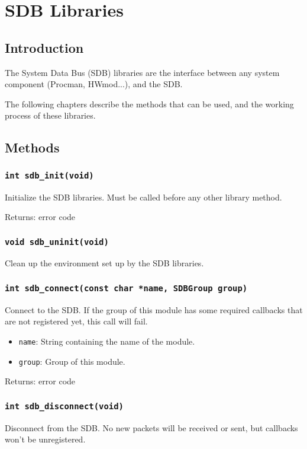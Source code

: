 \documentclass[12pt,a4paper]{report}
\begin{document}
\section*{SDB Libraries}

\subsection*{Introduction}
The System Data Bus (SDB) libraries are the interface between any system component (Procman, HWmod...), and the SDB.

The following chapters describe the methods that can be used, and the working process of these libraries.

\subsection*{Methods}
\subsubsection*{\texttt{int sdb\_init(void)}}
Initialize the SDB libraries. Must be called before any other library method.

Returns: error code

\subsubsection*{\texttt{void sdb\_uninit(void)}}
Clean up the environment set up by the SDB libraries.

\subsubsection*{\texttt{int sdb\_connect(const char *name, SDBGroup group)}}
Connect to the SDB. If the group of this module has some required callbacks that are not registered yet, this call will fail.

\begin{itemize}
\item \texttt{name}: String containing the name of the module.
\item \texttt{group}: Group of this module.
\end{itemize}

Returns: error code

\subsubsection*{\texttt{int sdb\_disconnect(void)}}
Disconnect from the SDB. No new packets will be received or sent, but callbacks won't be unregistered.
\end{document}
